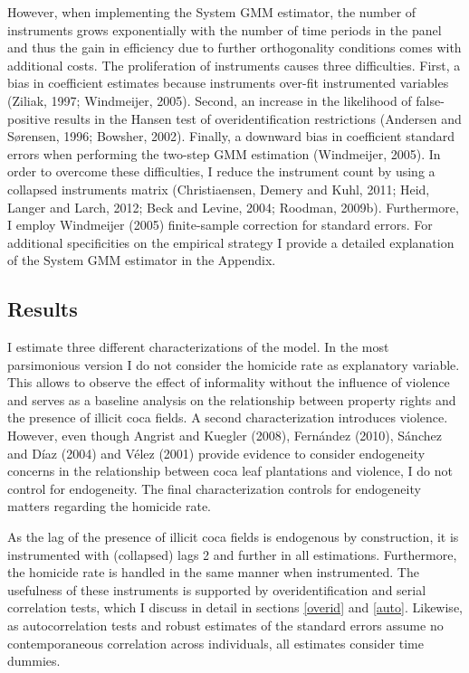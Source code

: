 \documentclass[a4paper, 12pt]{article}
\begin{document}
However, when implementing the System GMM estimator, the number of instruments grows exponentially with the number of time periods in the panel and thus the gain in efficiency due to further orthogonality conditions comes with additional costs. The proliferation of instruments causes three difficulties. First, a bias in coefficient estimates because instruments over-fit instrumented variables (Ziliak, 1997; Windmeijer, 2005). Second, an increase in the likelihood of false-positive results in the Hansen test of overidentification restrictions (Andersen and S\o rensen,  1996; Bowsher, 2002). Finally, a downward bias in coefficient standard errors when performing the two-step GMM estimation (Windmeijer, 2005). In order to overcome these difficulties, I reduce the instrument count by using a collapsed instruments matrix (Christiaensen, Demery and Kuhl, 2011; Heid, Langer and Larch, 2012; Beck and Levine, 2004; Roodman, 2009b). Furthermore, I employ Windmeijer (2005) finite-sample correction for standard errors. For additional specificities on the empirical strategy I provide a detailed explanation of the System GMM estimator in the Appendix.

\subsection{Results}
\label{results}

I estimate three different characterizations of the model. In the most parsimonious version I do not consider the homicide rate as explanatory variable. This allows to observe the effect of informality without the influence of violence and serves as a baseline analysis on the relationship between property rights and the presence of illicit coca fields. A second characterization introduces violence. However, even though Angrist and Kuegler (2008), Fern\'{a}ndez (2010), S\'{a}nchez and D\'{i}az (2004) and V\'{e}lez (2001) provide evidence to consider endogeneity concerns in the relationship between coca leaf plantations and violence, I do not control for endogeneity. The final characterization controls for endogeneity matters regarding the homicide rate. 

As the lag of the presence of illicit coca fields is endogenous by construction, it is instrumented with (collapsed) lags 2 and further in all estimations. Furthermore, the homicide rate is handled in the same manner when instrumented. The usefulness of these instruments is supported by overidentification and serial correlation tests, which I discuss in detail in sections \ref{overid} and \ref{auto}. Likewise, as autocorrelation tests and robust estimates of the standard errors assume no contemporaneous correlation across individuals, all estimates consider time dummies.
\end{document}
